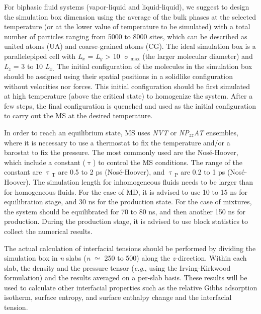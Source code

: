 \documentclass[9pt,bestpractices]{livecoms}
\begin{document}
For biphasic fluid systems (vapor-liquid and liquid-liquid), we suggest to
design the simulation box dimension using the average of the bulk phases at the
selected temperature (or at the lower value of temperature to be simulated)
with a total number of particles ranging from 5000 to 8000 sites, which can be
described as united atoms (UA) and coarse-grained atoms (CG). The ideal
simulation box is a parallelepiped cell with \textit{L}$_{x}$
= \textit{L}$_{y}$ {\textgreater} 10 ${\upsigma}$$_{\mathrm{max}}$ (the larger
molecular diameter) and \textit{L}$_{z}$ = 3 to 10
\textit{L}$_{x}$$_{\mathrm{.}}$ The initial configuration of the molecules in
the simulation box should be assigned using their spatial positions in
a solidlike configuration without velocities nor forces. This initial
configuration should be first simulated at high temperature (above the critical
state) to homogenize the system. After a few steps, the final configuration is
quenched and used as the initial configuration to carry out the MS at the
desired temperature.

In order to reach an equilibrium state, MS uses \textit{NVT} or
\textit{NP}$_{zz}$\textit{AT} ensembles, where it is necessary to use
a thermostat to fix the temperature and/or a barostat to fix the pressure. The
most commonly used are the Nos\'{e}-Hoover, which include a constant
({${\uptau}$}) to control the MS conditions. The range of the constant are
{${\uptau}$}$_{\mathrm{T}}$ are 0.5 to 2 ps (Nos\'{e}-Hoover), and
{${\uptau}$}$_{\mathrm{P}}$ are 0.2 to 1 ps (Nos\'{e}-Hoover). The simulation
length for inhomogeneous fluids needs to be larger than for homogeneous fluids.
For the case of MD, it is advised to use 10 to 15 ns for equilibration stage,
and 30 ns for the production state. For the case of mixtures, the system should
be equilibrated for 70 to 80 ns, and then another 150 ns for production. During
the production stage, it is advised to use block statistics to collect the
numerical results.

The actual calculation of interfacial tensions should be performed by dividing
the simulation box in \textit{n} slabs (\textit{n} ${\simeq}$ 250 to 500) along
the \textit{z-}direction. Within each slab, the density and the pressure tensor
(\textit{e.g}., using the Irving-Kirkwood formulation) and the results averaged
on a per-slab basis. These results will be used to calculate other interfacial
properties such as the relative Gibbs adsorption isotherm, surface entropy, and
surface enthalpy change and the interfacial tension.
\end{document}
